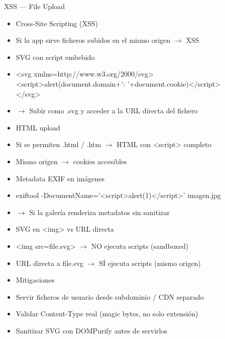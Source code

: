 \documentclass[aspectratio=169,10pt]{beamer}
\newcommand{\cmdbox}[1]{%
  \begin{center}%
  {\setlength{\fboxsep}{6pt}\colorbox{uzlav!40}{\parbox{0.88\linewidth}{\ttfamily\footnotesize #1}}}%
  \end{center}}
\begin{document}
\begin{frame}[allowframebreaks]{XSS --- File Upload}
\small
  \begin{itemize}
  \item Cross-Site Scripting (XSS)
  \item Si la app sirve ficheros subidos en el mismo origen $\rightarrow$ XSS
  \item SVG con script embebido
  \item[] \cmdbox{\textless{}svg xmlns=\textquotedbl{}http://www.w3.org/2000/svg\textquotedbl{}\textgreater{}\\{}
\textless{}script\textgreater{}alert(document.domain+': '+document.cookie)\textless{}/script\textgreater{}\\{}
\textless{}/svg\textgreater{}}
  \item $\rightarrow$ Subir como .svg y acceder a la URL directa del fichero
  \item HTML upload
  \item Si se permiten .html / .htm $\rightarrow$ HTML con \textless{}script\textgreater{} completo
  \item Mismo origen $\rightarrow$ cookies accesibles
  \item Metadata EXIF en imágenes
  \item[] \cmdbox{exiftool -DocumentName='\textless{}script\textgreater{}alert(1)\textless{}/script\textgreater{}' imagen.jpg}
  \item $\rightarrow$ Si la galería renderiza metadatos sin sanitizar
  \item SVG en \textless{}img\textgreater{} vs URL directa
  \item \textless{}img src=file.svg\textgreater{} $\rightarrow$ NO ejecuta scripts (sandboxed)
  \item URL directa a file.svg $\rightarrow$ SÍ ejecuta scripts (mismo origen)
  \item Mitigaciones
  \item Servir ficheros de usuario desde subdominio / CDN separado
  \item Validar Content-Type real (magic bytes, no solo extensión)
  \item Sanitizar SVG con DOMPurify antes de servirlos
  \end{itemize}
\end{frame}
\end{document}
